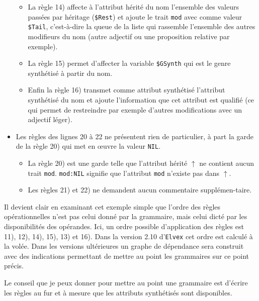 \documentclass[11pt]{article}
\begin{document}
\begin{itemize}
\begin{itemize}
  \item La règle 14) affecte à l'attribut hérité du nom l'ensemble des
    valeurs passées par héritage (\verb#$Rest#) et ajoute le trait
    \verb#mod# avec comme valeur
    \verb#$Tail#, c'est-à-dire la queue de la liste qui rassemble
    l'ensemble des autres modifieurs du nom (autre adjectif ou une
    proposition relative par exemple).
    
  \item La règle 15) permet d'affecter la  variable \verb#$GSynth#
    qui est le genre synthétisé à partir du nom.
    
  \item Enfin la règle 16) transmet comme attribut synthétisé l'attribut
    synthétisé du nom et ajoute l'information que cet attribut
    est qualifié (ce qui permet de restreindre par exemple d'autres
    modifications avec un adjectif léger).
    
\end{itemize}

\item Les règles des lignes 20 à 22 ne présentent rien de particulier,
  à part la garde de la règle 20) qui met en {\oe}uvre la valeur
  \verb#NIL#.

  \begin{itemize}    
  \item La règle 20) est une garde telle que l'attribut hérité
    $\uparrow$ ne contient aucun trait \texttt{mod}. \verb#mod:NIL#
    signifie que l'attribut \verb#mod# n'existe pas dans $\uparrow$.
    
  \item Les règles 21) et 22) ne demandent aucun commentaire
    supplémen-taire.
    
  \end{itemize}
\end{itemize}

Il devient clair en examinant cet exemple simple que l'ordre des
règles opérationnelles n'est pas celui donné par la grammaire, mais
celui dicté par les disponibilités des opérandes. Ici, un ordre possible
d'application des règles est 11), 12), 14), 15), 13) et 16). Dans la
version 2.10 d'\texttt{Elvex} cet ordre est calculé à la volée. Dans
les versions ultérieures un graphe de dépendance sera construit avec
des indications permettant de mettre au point les grammaires sur ce
point précis.

Le conseil que je peux donner pour mettre au point une grammaire est
d'écrire les règles au fur et à mesure que les attributs synthétisés
sont disponibles.
\end{document}
